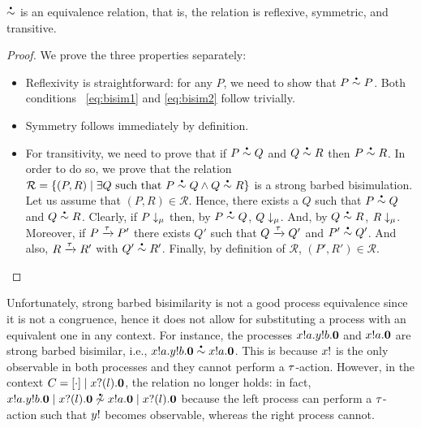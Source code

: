 \begin{theorem}
  \( \sbbisim{}{} \) is an equivalence relation, that is, the relation is reflexive, symmetric, and transitive.
\end{theorem}
\begin{proof}
  We prove the three properties separately: 
  \begin{itemize}
  \item Reflexivity is straightforward: for any $P$, we need to show
    that $P\sbbisim{}{} P$. Both conditions ~\ref{eq:bisim1} and \ref{eq:bisim2} follow trivially.
  \item Symmetry follows immediately by definition.
  \item For transitivity, we need to prove that if $P\sbbisim{}{} Q$
    and $Q\sbbisim{}{} R$ then $P\sbbisim{}{} R$. In order to do so,
    we prove that the relation
    $\mathcal R=\{(P,R)\mid \exists Q\text{ such that }P\sbbisim{}{} Q
    \land Q\sbbisim{}{} R\}$ is a strong barbed bisimulation. Let us
    assume that $(P,R)\in\mathcal R$. Hence, there exists a $Q$ such
    that $P\sbbisim{}{} Q$ and $Q\sbbisim{}{} R$. Clearly, if
    $P\downarrow_{\mu}$ then, by $P\sbbisim{}{} Q$,
    $Q\downarrow_{\mu}$. And, by $Q\sbbisim{}{} R$,
    $R\downarrow_{\mu}$. Moreover, if $P \xrightarrow{\tau} P'$
    there exists $Q'$ such that $Q \xrightarrow{\tau} Q'$ and
    $P'\sbbisim{}{}Q'$. And also, $R \xrightarrow{\tau} R'$ with
    $Q'\sbbisim{}{}R'$. Finally, by definition of $\mathcal R$,
    $(P',R')\in\mathcal R$.
  \end{itemize}
  
\end{proof}

Unfortunately, strong barbed bisimilarity is not a good process
equivalence since it is not a congruence, hence it does not allow for
substituting a process with an equivalent one in any context.
For instance, the processes $x ! a . y ! b . \bm{0}$ and
$x ! a . \bm{0}$ are strong barbed bisimilar, i.e.,
$\sbbisim{\Pout{x}{a}{\Pout{y}{b}{\Pend}}}{\Pout{x}{a}{\Pend}}$. This
is because \( x! \) is the only observable in both processes
and they cannot perform a \( \tau \)-action. However, in the context
$C = [\cdot] \mid x ? (l) . \bm{0}$, the relation no
longer holds: in fact,
$\nsbbisim{\Ppar{\Pout{x}{a}{\Pout{y}{b}{\Pend}}}{\Pin{x}{l}{\Pend}}}{\Pout{x}{a}{\Pend}\Ppar{}{\Pin{x}{l}{\Pend}}}$
%
because the left process can perform a \( \tau \)-action such that
\( y! \) becomes observable, whereas the right process cannot.

